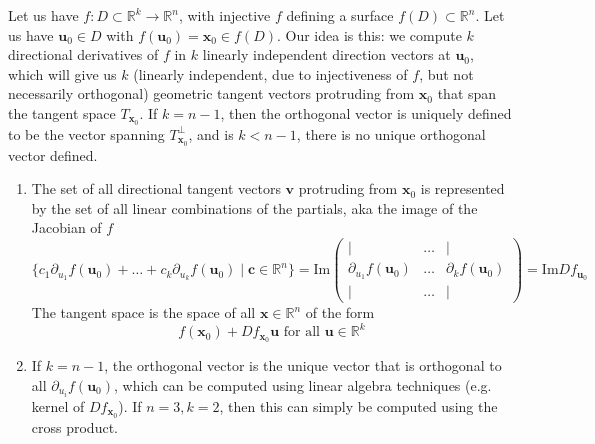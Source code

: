   \begin{theorem}
  Let us have $f: D \subset \mathbb{R}^k \longrightarrow \mathbb{R}^n$, with injective $f$ defining a surface $f(D) \subset \mathbb{R}^n$. Let us have $\mathbf{u}_0 \in D$ with $f(\mathbf{u}_0) = \mathbf{x}_0 \in f(D)$. Our idea is this: we compute $k$ directional derivatives of $f$ in $k$ linearly independent direction vectors at $\mathbf{u}_0$, which will give us $k$ (linearly independent, due to injectiveness of $f$, but not necessarily orthogonal) geometric tangent vectors protruding from $\mathbf{x}_0$ that span the tangent space $T_{\mathbf{x}_0}$. If $k = n-1$, then the orthogonal vector is uniquely defined to be the vector spanning $T_{\mathbf{x}_0}^\perp$, and is $k < n-1$, there is no unique orthogonal vector defined. 
  \begin{enumerate}
      \item The set of all directional tangent vectors $\mathbf{v}$ protruding from $\mathbf{x}_0$ is represented by the set of all linear combinations of the partials, aka the image of the Jacobian of $f$
      \[\{c_1 \partial_{u_1} f (\mathbf{u}_0) + \ldots + c_k \partial_{u_k} f (\mathbf{u}_0) \mid \mathbf{c} \in \mathbb{R}^n\} = \mathrm{Im} \begin{pmatrix} \vert & \ldots & \vert \\ \partial_{u_1} f (\mathbf{u}_0) & \ldots & \partial_{k} f (\mathbf{u}_0) \\ \vert & \ldots & \vert \end{pmatrix} = \mathrm{Im} D f_{\mathbf{u}_0}\]
      The tangent space is the space of all $\mathbf{x} \in \mathbb{R}^n$ of the form 
      \[f(\mathbf{x}_0) + D f_{\mathbf{x}_0} \mathbf{u} \text{ for all } \mathbf{u} \in \mathbb{R}^k\]
      \item If $k=n-1$, the orthogonal vector is the unique vector that is orthogonal to all $\partial_{u_i} f(\mathbf{u}_0)$, which can be computed using linear algebra techniques (e.g. kernel of $D f_{\mathbf{x}_0}$). If $n=3, k=2$, then this can simply be computed using the cross product. 
  \end{enumerate}
  \end{theorem}

